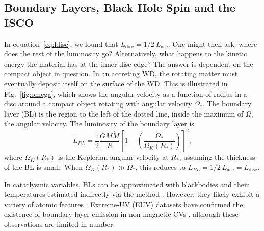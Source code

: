 \subsection{Boundary Layers, Black Hole Spin and the ISCO}
\label{sec:bl_isco}
In equation~\ref{eq:ldisc}, we found that $L_{\mathrm{disc}} = 1/2~L_{\mathrm{acc}}$. 
One might then ask: where does the rest of the luminosity go? Alternatively, 
what happens to the kinetic energy the material has at the inner disc edge?
The answer is dependent on the compact object in question. 
In an accreting WD, the rotating matter must eventually deposit itself 
on the surface of the WD. This is illustrated in Fig.~\ref{fig:omega},
which shows the angular velocity as a function of radius in a disc around
a compact object rotating with angular velocity $\Omega_*$. The boundary layer (BL)
is the region to the left of the dotted line, inside the maximum of $\Omega$, the
angular velocity. The luminosity of the boundary layer is \citep{fkrbook}
\begin{equation}
L_{BL} = \frac{1}{2}\frac{GM \dot{M}}{R} \left[1 - \left(\frac{\Omega_*}{\Omega_K(R_*)}\right)\right]^2,
\end{equation}
where $\Omega_K(R_*)$ is the Keplerian angular velocity at $R_*$, 
assuming the thickness
of the BL is small. When $\Omega_K(R_*) \gg {\Omega_*}$, this reduces to 
$L_{BL} = 1/2~L_{\mathrm{acc}} = L_{\mathrm{disc}}$.

In cataclysmic variables, 
BLs can be approximated with blackbodies and their temperatures estimated
indirectly via the \cite{zanstra1929} method \citep[e.g.][]{hoare1991,hoaredrew1993}.
However, they likely exhibit a variety of atomic features \citep{suleimanov2014}.
Extreme-UV (EUV) datasets have confirmed the existence of boundary layer emission
in non-magnetic CVs \citep{mauche1996}, although these observations
are limited in number.

